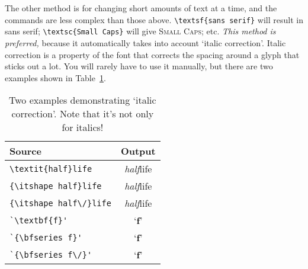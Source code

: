 \documentclass[12pt,article]{memoir}
\begin{document}
The other method is for changing short amounts of text at a time, and the
commands are less complex than those above. \verb|\textsf{sans serif}| will
result in \textsf{sans serif}; \verb|\textsc{Small Caps}| will give
\textsc{Small Caps}; etc. \emph{This method is preferred,} because it
automatically takes into account `italic correction'. Italic correction is a
property of the font that corrects the spacing around a glyph that sticks out a
lot. You will rarely have to use it manually, but there are two examples shown
in Table~\ref{tab:itcorr}.

\begin{table}
  \centering
  \begin{tabular}{lc}
    \toprule
    Source & Output \\
    \midrule
    \verb|\textit{half}life| & \textit{half}life \\
    \verb|{\itshape half}life| & {\itshape half}life \\
    \verb|{\itshape half\/}life| & {\itshape half\/}life \\
    \midrule
    \verb|`\textbf{f}'| & `\textbf{f}' \\
    \verb|`{\bfseries f}'| & `{\bfseries f}' \\
    \verb|`{\bfseries f\/}'| & `{\bfseries f\/}' \\
    \bottomrule
  \end{tabular}
  \caption{Two examples demonstrating `italic correction'. Note that it's not only for italics!}
  \label{tab:itcorr}
\end{table}
\end{document}
